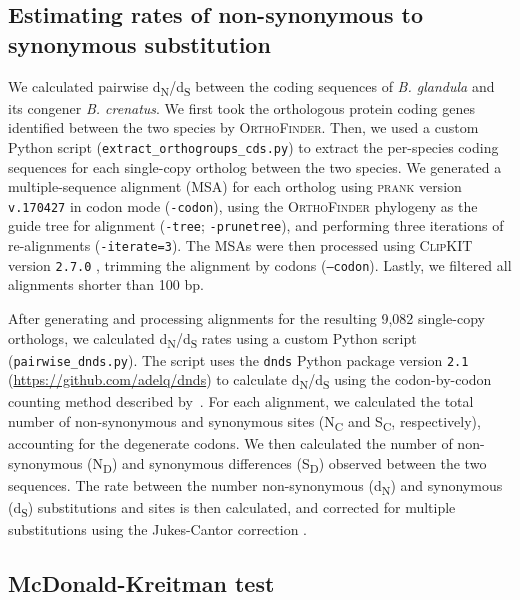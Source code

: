 \documentclass[11pt]{article}
\newcommand{\dnds}{d\textsubscript{N}/d\textsubscript{S}\xspace}
\newcommand{\bgla}{\textit{B. glandula}\xspace}
\begin{document}
\subsection*{Estimating rates of non-synonymous to synonymous substitution}

We calculated pairwise \dnds{} between the coding sequences of \bgla{} and its
congener \textit{B. crenatus}. We first took the orthologous protein coding genes
identified between the two species by \textsc{OrthoFinder}.
Then, we used a custom Python script (\texttt{extract\_orthogroups\_cds.py}) to
extract the per-species coding sequences for each single-copy ortholog between the
two species.
We generated a multiple-sequence alignment (MSA) for each ortholog using
\textsc{prank} version \texttt{v.170427} \citep{loytynoja2005_prank} in codon
mode (\texttt{-codon}), using the \textsc{OrthoFinder} phylogeny as the guide
tree for alignment (\texttt{-tree}; \texttt{-prunetree}), and performing three
iterations of re-alignments (\texttt{-iterate=3}).
The MSAs were then processed using \textsc{ClipKIT} version \texttt{2.7.0}
\citep{steenwyk2020_clipkit}, trimming the alignment by codons (\texttt{--codon}).
Lastly, we filtered all alignments shorter than 100 bp.
\vspace{0.2cm}

After generating and processing alignments for the resulting 9,082 single-copy
orthologs, we calculated \dnds{} rates using a custom Python script
(\texttt{pairwise\_dnds.py}).
The script uses the \texttt{dnds} Python package version \texttt{2.1}
(\url{https://github.com/adelq/dnds}) to calculate \dnds{} using the codon-by-codon
counting method described by~\cite{nei1986_dnds}.
For each alignment, we calculated the total number of non-synonymous and
synonymous sites (N\textsubscript{C} and S\textsubscript{C}, respectively),
accounting for the degenerate codons.
We then calculated the number of non-synonymous (N\textsubscript{D}) and
synonymous differences (S\textsubscript{D}) observed between the two sequences.
The rate between the number non-synonymous (d\textsubscript{N}) and synonymous
(d\textsubscript{S}) substitutions and sites is then calculated, and corrected for
multiple substitutions using the Jukes-Cantor correction \citep{JC69}.

\subsection*{McDonald-Kreitman test}
\end{document}
